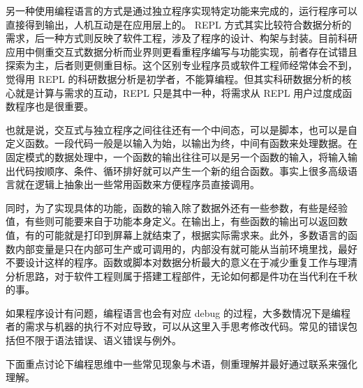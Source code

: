 \documentclass[]{tufte-book}
\begin{document}
另一种使用编程语言的方式是通过独立程序实现特定功能来完成的，运行程序可以直接得到输出，人机互动是在应用层上的。 REPL 方式其实比较符合数据分析的需求，后一种方式则反映了软件工程，涉及了程序的设计、构架与封装。目前科研应用中侧重交互式数据分析而业界则更看重程序编写与功能实现，前者存在试错且探索为主，后者则更侧重目标。这个区别专业程序员或软件工程师经常体会不到，觉得用 REPL 的科研数据分析是初学者，不能算编程。但其实科研数据分析的核心就是计算与需求的互动，REPL 只是其中一种，将需求从 REPL 用户过度成函数程序也是很重要。

也就是说，交互式与独立程序之间往往还有一个中间态，可以是脚本，也可以是自定义函数。一段代码一般是以输入为始，以输出为终，中间有函数来处理数据。在固定模式的数据处理中，一个函数的输出往往可以是另一个函数的输入，将输入输出代码按顺序、条件、循环排好就可以产生一个新的组合函数。事实上很多高级语言就在逻辑上抽象出一些常用函数来方便程序员直接调用。

同时，为了实现具体的功能，函数的输入除了数据外还有一些参数，有些是经验值，有些则可能要来自于功能本身定义。在输出上，有些函数的输出可以返回数值，有的可能就是打印到屏幕上就结束了，根据实际需求来。此外，多数语言的函数内部变量是只在内部可生产或可调用的，内部没有就可能从当前环境里找，最好不要设计这样的程序。函数或脚本对数据分析最大的意义在于减少重复工作与理清分析思路，对于软件工程则属于搭建工程部件，无论如何都是件功在当代利在千秋的事。

如果程序设计有问题，编程语言也会有对应 debug 的过程，大多数情况下是编程者的需求与机器的执行不对应导致，可以从这里入手思考修改代码。常见的错误包括但不限于语法错误、语义错误与例外。

下面重点讨论下编程思维中一些常见现象与术语，侧重理解并最好通过联系来强化理解。
\end{document}

